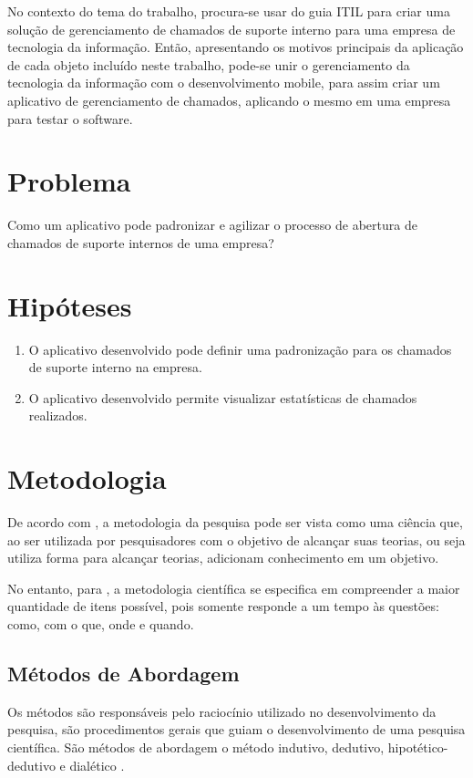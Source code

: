 No contexto do tema do trabalho, procura-se usar do guia ITIL para criar uma solução de gerenciamento de chamados de suporte interno para uma empresa de tecnologia da informação. Então, apresentando os motivos principais da aplicação de cada objeto incluído neste trabalho, pode-se unir o gerenciamento da tecnologia da informação com o desenvolvimento mobile, para assim criar um aplicativo de gerenciamento de chamados, aplicando o mesmo em uma empresa para testar o software.

\section{Problema} \label{sec::Problem}
Como um aplicativo pode padronizar e agilizar o processo de abertura de chamados de suporte internos de uma empresa?

\section{Hipóteses} \label{sec::Hypothesis}
\begin{enumerate}
    \item O aplicativo desenvolvido pode definir uma padronização para os chamados de suporte interno na empresa.
    \item O aplicativo desenvolvido permite visualizar estatísticas de chamados realizados.
\end{enumerate}

\section{Metodologia} \label{sec:Methodology}
De acordo com \citet{lovato_2007}, a metodologia da pesquisa pode ser vista como uma ciência que, ao ser utilizada por pesquisadores com o objetivo de alcançar suas teorias, ou seja utiliza forma para alcançar teorias, adicionam conhecimento em um objetivo.

No entanto, para \citet{marconi_lakatos_2010}, a metodologia científica se especifica em compreender a maior quantidade de itens possível, pois somente responde a um  tempo às questões: como, com o que, onde e quando.

\subsection{Métodos de Abordagem}
Os métodos são responsáveis pelo raciocínio utilizado no desenvolvimento da pesquisa, são procedimentos gerais que guiam o desenvolvimento de uma pesquisa científica. São métodos de abordagem o método indutivo, dedutivo, hipotético-dedutivo e dialético \citep{metodologia_maria_andrade}.

